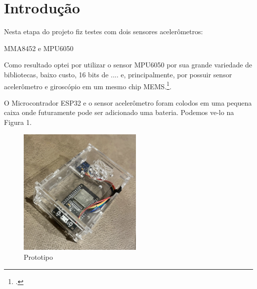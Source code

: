 \section{Introdução}


Nesta etapa do projeto fiz testes com dois sensores acelerômetros:

MMA8452 e MPU6050

Como resultado optei por utilizar o sensor MPU6050 por sua grande variedade de bibliotecas,
baixo custo, 16 bits de .... e, principalmente, por possuir sensor acelerômetro e giroscópio em um mesmo chip MEMS.\footcite{MEMS: Micro Eletro Mechanical System.}.

O Microcontrador ESP32 e o sensor acelerômetro foram colodos em uma pequena caixa onde futuramente pode ser adicionado uma bateria. Podemos ve-lo na Figura 1.


\begin{figure}[H]
    \center
    \includegraphics[width=6cm]{images/Prototipo}
    \caption{Prototipo}
\end{figure}
